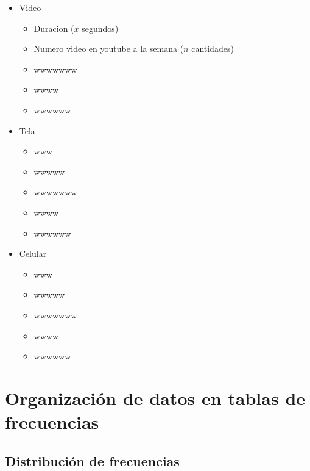 \documentclass[10pt,]{krantz}
\providecommand{\tightlist}{%
  \setlength{\itemsep}{0pt}\setlength{\parskip}{0pt}}
\theoremstyle{definition}
\theoremstyle{definition}
\theoremstyle{definition}
\theoremstyle{definition}
\theoremstyle{remark}
\begin{document}
\begin{enumerate}
  \begin{itemize}
  \item
    Video

    \begin{itemize}
    \tightlist
    \item
      Duracion (\(x\) segundos)
    \item
      Numero video en youtube a la semana (\(n\) cantidades)
    \item
      wwwwwww
    \item
      wwww
    \item
      wwwwww
    \end{itemize}
  \item
    Tela

    \begin{itemize}
    \tightlist
    \item
      www
    \item
      wwwww
    \item
      wwwwwww
    \item
      wwww
    \item
      wwwwww
    \end{itemize}
  \item
    Celular

    \begin{itemize}
    \tightlist
    \item
      www
    \item
      wwwww
    \item
      wwwwwww
    \item
      wwww
    \item
      wwwwww
    \end{itemize}
  \end{itemize}
\end{enumerate}

\hypertarget{organizaciuxf3n-de-datos-en-tablas-de-frecuencias}{%
\chapter{Organización de datos en tablas de frecuencias}\label{organizaciuxf3n-de-datos-en-tablas-de-frecuencias}}

\hypertarget{distribuciuxf3n-de-frecuencias}{%
\section{Distribución de frecuencias}\label{distribuciuxf3n-de-frecuencias}}
\end{document}
